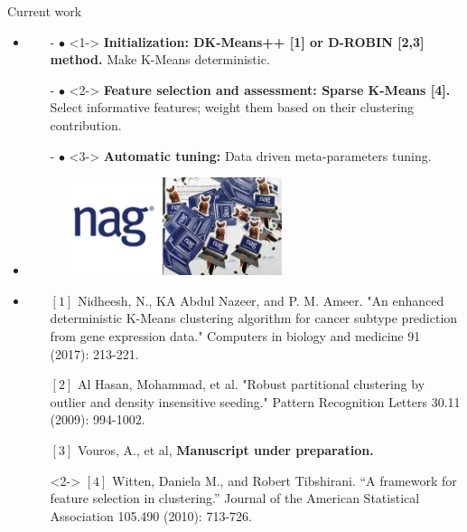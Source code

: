 \documentclass{beamer}
\newlength{\tmpShadow}
\newcommand{\MyShadow}[2]{%
	\settowidth{\tmpShadow}{#1}
	\addtolength{\tmpShadow}{.1em}
	\raisebox{-0.25ex}{\textcolor{gray!70}{#1}}%
	\kern-\tmpShadow%
	\textcolor{#2}{#1}%
}
\begin{document}
{\begin{frame}{Current work}
\begin{itemize}[leftmargin=*]
	\item
	\begin{itemize}[leftmargin=*]
		\item[{\MyShadow{$\bullet$}{blue!80}}]<1-> \textbf{Initialization: DK-Means++ [1] or D-ROBIN [2,3] method.} Make K-Means deterministic. 
		\item[{\MyShadow{$\bullet$}{blue!80}}]<2-> \textbf{Feature selection and assessment: Sparse K-Means [4].} Select informative features; weight them based on their clustering contribution.
		\item[{\MyShadow{$\bullet$}{red!80}}]<3-> \textbf{Automatic tuning:} Data driven meta-parameters tuning.
	\end{itemize}	
	\item<4->
	\begin{figure}[H]
		\centering
		\includegraphics[width=0.6\textwidth]{figures/NAG2}
	\end{figure}
	\item
	\vspace{0.6cm}
	\begin{tiny}
		\begin{itemize}[leftmargin=*]
			\item[] $[1]$ Nidheesh, N., KA Abdul Nazeer, and P. M. Ameer. "An enhanced deterministic K-Means clustering algorithm for cancer subtype prediction from gene expression data." Computers in biology and medicine 91 (2017): 213-221.			
			\item[] $[2]$ Al Hasan, Mohammad, et al. "Robust partitional clustering by outlier and density insensitive seeding." Pattern Recognition Letters 30.11 (2009): 994-1002.
			\item[] $[3]$ Vouros, A., et al, \textbf{Manuscript under preparation.}	
			\item[]<2-> $[4]$ Witten, Daniela M., and Robert Tibshirani. ``A framework for feature selection in clustering.'' Journal of the American Statistical Association 105.490 (2010): 713-726.						
		\end{itemize}
	\end{tiny}		
\end{itemize}	
\end{frame}


}
\end{document}
